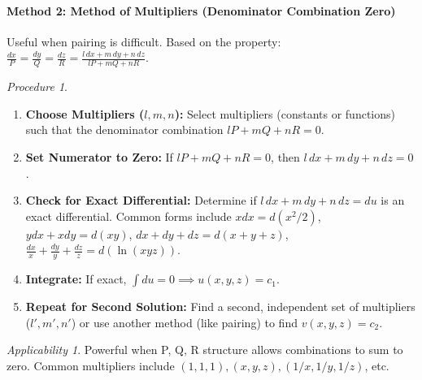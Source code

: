 \documentclass{article}
\theoremstyle{remark}
\newtheorem{procedure}{Procedure}[subsection] %
\newtheorem{applicability}{Applicability}[subsection] %
\begin{document}
	\paragraph{Method 2: Method of Multipliers (Denominator Combination Zero)}
	\label{lagrange:method:multipliers}
	Useful when pairing is difficult.
	Based on the property: $\frac{dx}{P} = \frac{dy}{Q} = \frac{dz}{R} = \frac{l\,dx + m\,dy + n\,dz}{lP + mQ + nR}$.
	\begin{procedure}
		\begin{enumerate}
			\item \textbf{Choose Multipliers ($l,m,n$):} Select multipliers (constants or functions) such that the denominator combination $lP + mQ + nR = 0$.
			\item \textbf{Set Numerator to Zero:} If $lP+mQ+nR=0$, then $l\,dx + m\,dy + n\,dz = 0$.
			\item \textbf{Check for Exact Differential:} Determine if $l\,dx + m\,dy + n\,dz = du$ is an exact differential. Common forms include $x dx = d(x^2/2)$, $y dx + x dy = d(xy)$, $dx+dy+dz = d(x+y+z)$, $\frac{dx}{x} + \frac{dy}{y} + \frac{dz}{z} = d(\ln(xyz))$.
			\item \textbf{Integrate:} If exact, $\int du = 0 \implies u(x, y, z) = c_1$.
			\item \textbf{Repeat for Second Solution:} Find a second, independent set of multipliers ($l', m', n'$) or use another method (like pairing) to find $v(x, y, z) = c_2$.
		\end{enumerate}
	\end{procedure}
	\begin{applicability}
		Powerful when P, Q, R structure allows combinations to sum to zero. Common multipliers include $(1,1,1), (x,y,z), (1/x, 1/y, 1/z)$, etc.
	\end{applicability}
	
\end{document}
